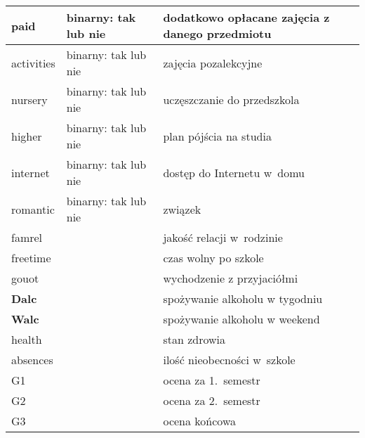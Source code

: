\begin{table}[h]
\begin{tabular}{|p{1.4cm}|p{3cm}|p{3cm}|}
paid  &  binarny: tak lub nie    &  dodatkowo opłacane zajęcia z danego przedmiotu  \\ \hline
activities   &  binarny: tak lub nie  &  zajęcia pozalekcyjne    \\ \hline
nursery   &   binarny: tak lub nie   &   uczęszczanie do przedszkola \\ \hline
higher   &  binarny: tak lub nie   &  plan pójścia na studia  \\ \hline
internet   &   binarny: tak lub nie   &  dostęp do Internetu w~domu  \\ \hline
romantic   &   binarny: tak lub nie   &   związek \\ \hline
famrel  &      & jakość relacji w~rodzinie  \\ \hline
freetime   &      & czas wolny po szkole   \\ \hline
gouot   &      &  wychodzenie z przyjaciółmi  \\ \hline
\textbf{Dalc}  &      & spożywanie alkoholu w tygodniu   \\ \hline
\textbf{Walc}   &      &  spożywanie alkoholu w weekend  \\ \hline
health   &      & stan zdrowia   \\ \hline
absences  &      &  ilość nieobecności w~szkole  \\ \hline
G1  &      &   ocena za 1.~semestr \\ \hline
G2  &      &  ocena za 2.~semestr  \\ \hline
G3   &      &  ocena końcowa  \\ \hline
\end{tabular}
\end{table}
